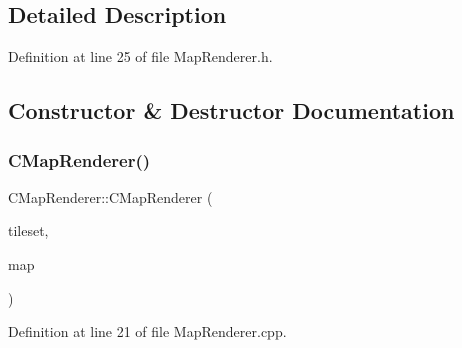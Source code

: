 \subsection{Detailed Description}


Definition at line 25 of file Map\+Renderer.\+h.



\subsection{Constructor \& Destructor Documentation}
\hypertarget{classCMapRenderer_a9aca3f780976a94fc6e8873e3cf8e199}{}\label{classCMapRenderer_a9aca3f780976a94fc6e8873e3cf8e199} 
\subsubsection{\texorpdfstring{C\+Map\+Renderer()}{CMapRenderer()}}
{\footnotesize\ttfamily C\+Map\+Renderer\+::\+C\+Map\+Renderer (\begin{DoxyParamCaption}\item[{std\+::shared\+\_\+ptr$<$ \hyperlink{classCGraphicTileset}{C\+Graphic\+Tileset} $>$}]{tileset,  }\item[{std\+::shared\+\_\+ptr$<$ \hyperlink{classCTerrainMap}{C\+Terrain\+Map} $>$}]{map }\end{DoxyParamCaption})}



Definition at line 21 of file Map\+Renderer.\+cpp.


